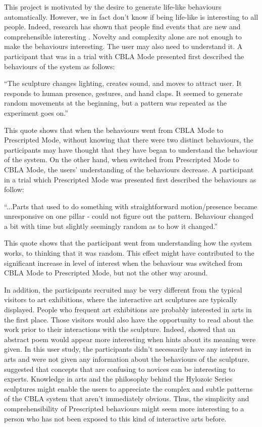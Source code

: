 This project is motivated by the desire to generate life-like behaviours automatically. However, we in fact don't know if being life-like is interesting to all people. Indeed, research has shown that people find events that are new and comprehensible interesting \cite{Silvia2008}. Novelty and complexity alone are not enough to make the behaviours interesting. The user may also need to understand it. A participant that was in a trial with CBLA Mode presented first described the behaviours of the system as follows: 
\begin{blockquote}
``The sculpture changes lighting, creates sound, and moves to attract user. It responds to human presence, gestures, and hand claps. It seemed to generate random movements at the beginning, but a pattern was repeated as the experiment goes on.''
\end{blockquote}
This quote shows that when the behaviours went from CBLA Mode to Prescripted Mode, without knowing that there were two distinct behaviours, the participants may have thought that they have began to understand the behaviour of the system. On the other hand, when switched from Prescripted Mode to CBLA Mode, the users' understanding of the behaviours decrease. A participant in a trial which Prescripted Mode was presented first described the behaviours as follow:
\begin{blockquote}
	``...Parts that used to do something with straightforward motion/presence became unresponsive on one pillar - could not figure out the pattern. Behaviour changed a bit with time but slightly seemingly random as to how it changed.''
\end{blockquote}
This quote shows that the participant went from understanding how the system works, to thinking that it was random. This effect might have contributed to the significant increase in level of interest when the behaviour was switched from CBLA Mode to Prescripted Mode, but not the other way around.


In addition, the participants recruited may be very different from the typical visitors to art exhibitions, where the interactive art sculptures are typically displayed. People who frequent art exhibitions are probably interested in arts in the first place. Those visitors would also have the opportunity to read about the work prior to their interactions with the sculpture. Indeed, \cite{Silvia2005} showed that an abstract poem would appear more interesting when hints about its meaning were given. In this user study, the participants didn't necessarily have any interest in arts and were not given any information about the behaviours of the sculpture. \cite{Silvia2008} suggested that concepts that are confusing to novices can be interesting to experts. Knowledge in arts and the philosophy behind the Hylozoic Series sculptures might enable the users to appreciate the complex and subtle patterns of the CBLA system that aren't immediately obvious. Thus, the simplicity and comprehensibility of Prescripted behaviours might seem more interesting to a person who has not been exposed to this kind of interactive arts before. 

